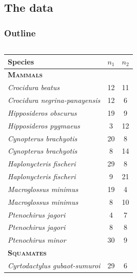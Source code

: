 \subsection{The data}

\begin{frame}
\frametitle{Outline}
\end{frame}

\begin{frame}
\begin{columns}[c]
        \begin{table}%
            \scriptsize
            \addtolength{\tabcolsep}{-0.09cm}
            \centering
            \begin{tabular}{ l c c }
                \textbf{Species} & {\boldmath $n_1$} & {\boldmath $n_2$} \\
                \hline
                \textbf{\textsc{Mammals}} & & \\
                \emph{Crocidura beatus}             & 12 & 11 \\
                \emph{Crocidura negrina-panayensis} & 12 & 6  \\
                \emph{Hipposideros obscurus}        & 19 & 9  \\
                \emph{Hipposideros pygmaeus}        & 3  & 12 \\
                \emph{Cynopterus brachyotis}        & 20 & 8  \\
                \emph{Cynopterus brachyotis}        & 8  & 14 \\
                \emph{Haplonycteris fischeri}       & 29 & 8  \\
                \emph{Haplonycteris fischeri}       & 9  & 21 \\
                \emph{Macroglossus minimus}         & 19 & 4  \\
                \emph{Macroglossus minimus}         & 8  & 10 \\
                \emph{Ptenochirus jagori}           & 4  & 7  \\
                \emph{Ptenochirus jagori}           & 8  & 8  \\
                \emph{Ptenochirus minor}            & 30 & 9  \\
                \textbf{\textsc{Squamates}} & & \\
                \emph{Cyrtodactylus gubaot-sumuroi} & 29 & 6  \\

\end{tabular}
\end{table}
\end{columns}
\end{frame}
